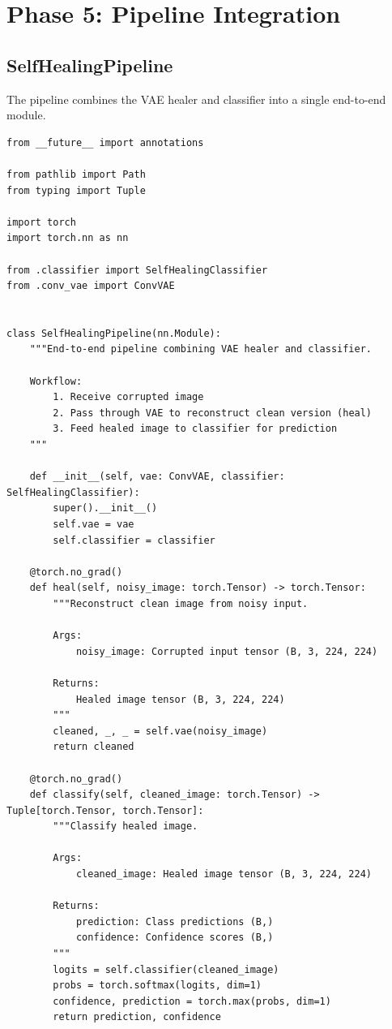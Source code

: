 \documentclass[11pt,a4paper]{article}
\begin{document}
\newpage
\section{Phase 5: Pipeline Integration}
\label{sec:phase5}

\subsection{SelfHealingPipeline}

The pipeline combines the VAE healer and classifier into a single end-to-end module.

\begin{lstlisting}[caption={src/pipeline.py - Complete File}, label={lst:pipeline}]
from __future__ import annotations

from pathlib import Path
from typing import Tuple

import torch
import torch.nn as nn

from .classifier import SelfHealingClassifier
from .conv_vae import ConvVAE


class SelfHealingPipeline(nn.Module):
    """End-to-end pipeline combining VAE healer and classifier.

    Workflow:
        1. Receive corrupted image
        2. Pass through VAE to reconstruct clean version (heal)
        3. Feed healed image to classifier for prediction
    """

    def __init__(self, vae: ConvVAE, classifier: SelfHealingClassifier):
        super().__init__()
        self.vae = vae
        self.classifier = classifier

    @torch.no_grad()
    def heal(self, noisy_image: torch.Tensor) -> torch.Tensor:
        """Reconstruct clean image from noisy input.

        Args:
            noisy_image: Corrupted input tensor (B, 3, 224, 224)

        Returns:
            Healed image tensor (B, 3, 224, 224)
        """
        cleaned, _, _ = self.vae(noisy_image)
        return cleaned

    @torch.no_grad()
    def classify(self, cleaned_image: torch.Tensor) -> Tuple[torch.Tensor, torch.Tensor]:
        """Classify healed image.

        Args:
            cleaned_image: Healed image tensor (B, 3, 224, 224)

        Returns:
            prediction: Class predictions (B,)
            confidence: Confidence scores (B,)
        """
        logits = self.classifier(cleaned_image)
        probs = torch.softmax(logits, dim=1)
        confidence, prediction = torch.max(probs, dim=1)
        return prediction, confidence


\end{lstlisting}
\end{document}
